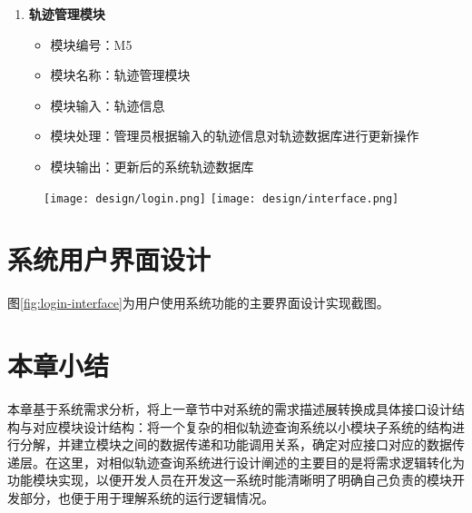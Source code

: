 \begin{enumerate}
	\item \textbf{轨迹管理模块}
	\begin{itemize}
		\item 模块编号：M5
		\item 模块名称：轨迹管理模块
		\item 模块输入：轨迹信息
		\item 模块处理：管理员根据输入的轨迹信息对轨迹数据库进行更新操作
		\item 模块输出：更新后的系统轨迹数据库
	\end{itemize}
\end{enumerate}

\begin{figure}[!htp]
  \centering
  \texttt{[image: design/login.png]}
  \hspace{0.5cm}
  \texttt{[image: design/interface.png]}
\end{figure}

\section{系统用户界面设计}
\label{sec:window interface}
图\ref{fig:login-interface}为用户使用系统功能的主要界面设计实现截图。






\section{本章小结}
\label{sec:design conclusion}
本章基于系统需求分析，将上一章节中对系统的需求描述展转换成具体接口设计结构与对应模块设计结构：将一个复杂的相似轨迹查询系统以小模块子系统的结构进行分解，并建立模块之间的数据传递和功能调用关系，确定对应接口对应的数据传递层。在这里，对相似轨迹查询系统进行设计阐述的主要目的是将需求逻辑转化为功能模块实现，以便开发人员在开发这一系统时能清晰明了明确自己负责的模块开发部分，也便于用于理解系统的运行逻辑情况。
